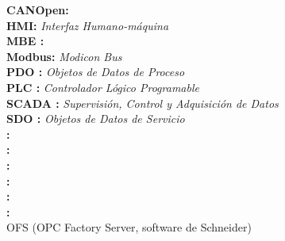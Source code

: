 \noindent
\textbf{CANOpen:} \textit{}\\
\textbf{HMI:} \textit{Interfaz Humano-máquina}\\
\textbf{MBE :} \textit{}\\
\textbf{Modbus:} \textit{Modicon Bus}\\
\textbf{PDO :} \textit{Objetos de Datos de Proceso}\\
\textbf{PLC :} \textit{Controlador Lógico Programable}\\
\textbf{SCADA :} \textit{Supervisión, Control y Adquisición de Datos}\\ %
\textbf{SDO :} \textit{Objetos de Datos de Servicio}\\
\textbf{ :} \textit{}\\
\textbf{ :} \textit{}\\
\textbf{ :} \textit{}\\
\textbf{ :} \textit{}\\
\textbf{ :} \textit{}\\
\textbf{ :} \textit{}\\
OFS (OPC Factory Server, software de Schneider)

\newpage